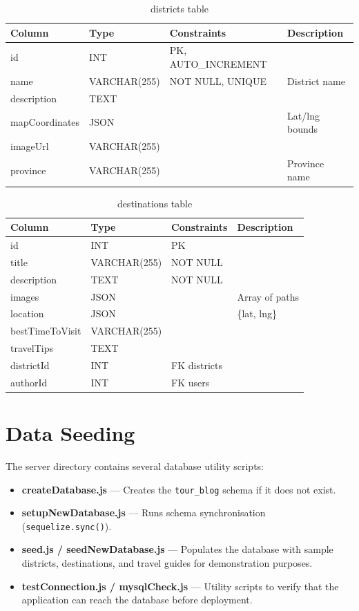 \documentclass[12pt,a4paper]{report}
\begin{document}
\begin{table}[H]
  \centering
  \caption{districts table}
  \begin{tabular}{llll}
    \toprule
    Column & Type & Constraints & Description \\
    \midrule
    id             & INT & PK, AUTO\_INCREMENT & \\
    name           & VARCHAR(255) & NOT NULL, UNIQUE & District name \\
    description    & TEXT & & \\
    mapCoordinates & JSON & & Lat/lng bounds \\
    imageUrl       & VARCHAR(255) & & \\
    province       & VARCHAR(255) & & Province name \\
    \bottomrule
  \end{tabular}
\end{table}

\begin{table}[H]
  \centering
  \caption{destinations table}
  \begin{tabular}{llll}
    \toprule
    Column & Type & Constraints & Description \\
    \midrule
    id              & INT & PK & \\
    title           & VARCHAR(255) & NOT NULL & \\
    description     & TEXT & NOT NULL & \\
    images          & JSON & & Array of paths \\
    location        & JSON & & \{lat, lng\} \\
    bestTimeToVisit & VARCHAR(255) & & \\
    travelTips      & TEXT & & \\
    districtId      & INT & FK districts & \\
    authorId        & INT & FK users & \\
    \bottomrule
  \end{tabular}
\end{table}

\section{Data Seeding}

The server directory contains several database utility scripts:

\begin{itemize}[leftmargin=2em]
  \item \textbf{createDatabase.js} — Creates the \texttt{tour\_blog} schema if it does not exist.
  \item \textbf{setupNewDatabase.js} — Runs schema synchronisation (\texttt{sequelize.sync()}).
  \item \textbf{seed.js / seedNewDatabase.js} — Populates the database with sample districts, destinations, and travel guides for demonstration purposes.
  \item \textbf{testConnection.js / mysqlCheck.js} — Utility scripts to verify that the application can reach the database before deployment.
\end{itemize}
\end{document}

